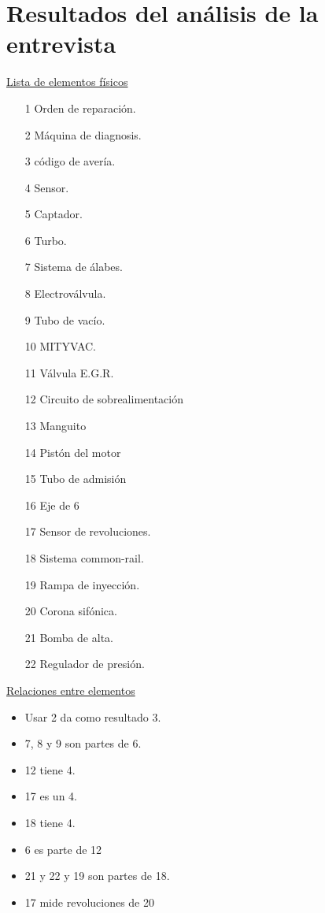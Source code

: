 \documentclass[a4paper,12pt]{article}
\begin{document}
\section{Resultados del análisis de la entrevista}
\underline{Lista de elementos físicos}
\begin{itemize}
\item[1] Orden de reparación.
\item[2] Máquina de diagnosis.
\item[3] código de avería.
\item[4] Sensor.
\item[5] Captador.
\item[6] Turbo.
\item[7] Sistema de álabes.
\item[8] Electroválvula.
\item[9] Tubo de vacío.
\item[10] MITYVAC.
\item[11] Válvula E.G.R.
\item[12] Circuito de sobrealimentación
\item[13] Manguito
\item[14] Pistón del motor
\item[15] Tubo de admisión
\item[16] Eje de 6
\item[17] Sensor de revoluciones.
\item[18] Sistema common-rail.
\item[19] Rampa de inyección.
\item[20] Corona sifónica.
\item[21] Bomba de alta.
\item[22] Regulador de presión.
\end{itemize}

\underline{Relaciones entre elementos}
\begin{itemize}
\item Usar 2 da como resultado 3.
\item 7, 8 y 9 son partes de 6.
\item 12 tiene 4.
\item 17 es un 4.
\item 18 tiene 4.
\item 6 es parte de 12
\item 21 y 22 y 19 son partes de 18.
\item 17 mide revoluciones de 20
\end{itemize}
\end{document}
